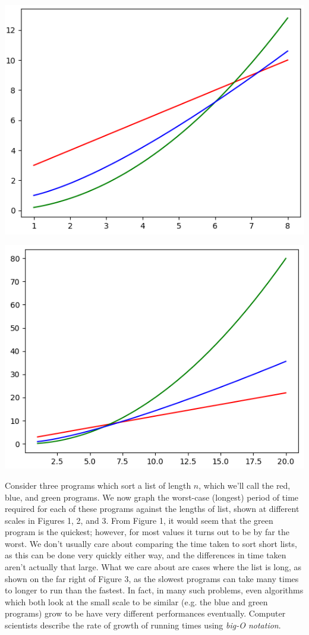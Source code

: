 \documentclass{article}
\begin{document}
\includegraphics{mediumgraph}

\includegraphics{largegraph}

Consider three programs which sort a list of length \(n\), which we'll call the red, blue, and green programs. We now graph the worst-case (longest) period of time required for each of these programs against the lengths of list, shown at different scales in Figures 1, 2, and 3. From Figure 1, it would seem that the green program is the quickest; however, for most values it turns out to be by far the worst. We don't usually care about comparing the time taken to sort short lists, as this can be done very quickly either way, and the differences in time taken aren't actually that large. What we care about are cases where the list is long, as shown on the far right of Figure 3, as the slowest programs can take many times to longer to run than the fastest. In fact, in many such problems, even algorithms which both look at the small scale to be similar (e.g. the blue and green programs) grow to be have very different performances eventually. Computer scientists describe the rate of growth of running times using \textit{big-O notation}.
\end{document}
